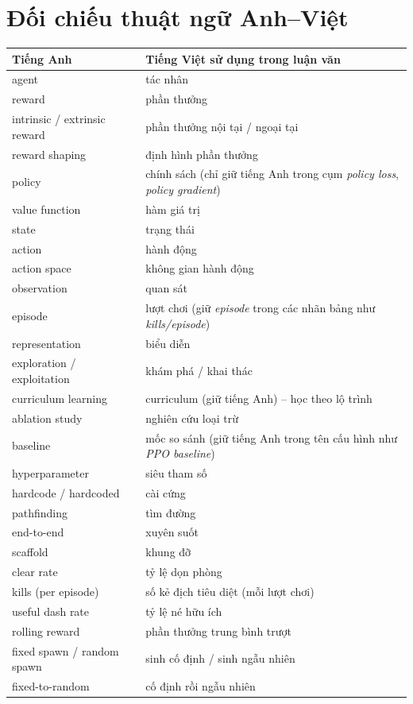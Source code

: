 \section*{Đối chiếu thuật ngữ Anh--Việt}
\noindent
\begin{tabular}{p{5cm} p{9cm}}
\textbf{Tiếng Anh} & \textbf{Tiếng Việt sử dụng trong luận văn} \\
\hline
agent & tác nhân \\
reward & phần thưởng \\
intrinsic / extrinsic reward & phần thưởng nội tại / ngoại tại \\
reward shaping & định hình phần thưởng \\
policy & chính sách (chỉ giữ tiếng Anh trong cụm \textit{policy loss}, \textit{policy gradient}) \\
value function & hàm giá trị \\
state & trạng thái \\
action & hành động \\
action space & không gian hành động \\
observation & quan sát \\
episode & lượt chơi (giữ \textit{episode} trong các nhãn bảng như \textit{kills/episode}) \\
representation & biểu diễn \\
exploration / exploitation & khám phá / khai thác \\
curriculum learning & curriculum (giữ tiếng Anh) -- học theo lộ trình \\
ablation study & nghiên cứu loại trừ \\
baseline & mốc so sánh (giữ tiếng Anh trong tên cấu hình như \textit{PPO baseline}) \\
hyperparameter & siêu tham số \\
hardcode / hardcoded & cài cứng \\
pathfinding & tìm đường \\
end-to-end & xuyên suốt \\
scaffold & khung đỡ \\
clear rate & tỷ lệ dọn phòng \\
kills (per episode) & số kẻ địch tiêu diệt (mỗi lượt chơi) \\
useful dash rate & tỷ lệ né hữu ích \\
rolling reward & phần thưởng trung bình trượt \\
fixed spawn / random spawn & sinh cố định / sinh ngẫu nhiên \\
fixed-to-random & cố định rồi ngẫu nhiên \\

\end{tabular}
